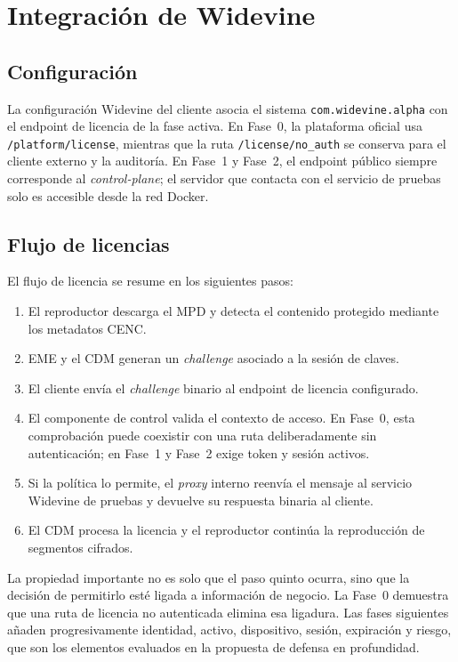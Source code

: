 \section{Integración de Widevine}

\subsection{Configuración}

La configuración Widevine del cliente asocia el sistema \nolinkurl{com.widevine.alpha} con el endpoint de licencia de la fase activa. En Fase~0, la plataforma oficial usa \nolinkurl{/platform/license}, mientras que la ruta \nolinkurl{/license/no_auth} se conserva para el cliente externo y la auditoría. En Fase~1 y Fase~2, el endpoint público siempre corresponde al \textit{control-plane}; el servidor que contacta con el servicio de pruebas solo es accesible desde la red Docker.

\subsection{Flujo de licencias}

El flujo de licencia se resume en los siguientes pasos:

\begin{enumerate}
    \item El reproductor descarga el MPD y detecta el contenido protegido mediante los metadatos CENC.
    \item EME y el CDM generan un \textit{challenge} asociado a la sesión de claves.
    \item El cliente envía el \textit{challenge} binario al endpoint de licencia configurado.
    \item El componente de control valida el contexto de acceso. En Fase~0, esta comprobación puede coexistir con una ruta deliberadamente sin autenticación; en Fase~1 y Fase~2 exige token y sesión activos.
    \item Si la política lo permite, el \textit{proxy} interno reenvía el mensaje al servicio Widevine de pruebas y devuelve su respuesta binaria al cliente.
    \item El CDM procesa la licencia y el reproductor continúa la reproducción de segmentos cifrados.
\end{enumerate}

La propiedad importante no es solo que el paso quinto ocurra, sino que la decisión de permitirlo esté ligada a información de negocio. La Fase~0 demuestra que una ruta de licencia no autenticada elimina esa ligadura. Las fases siguientes añaden progresivamente identidad, activo, dispositivo, sesión, expiración y riesgo, que son los elementos evaluados en la propuesta de defensa en profundidad.

